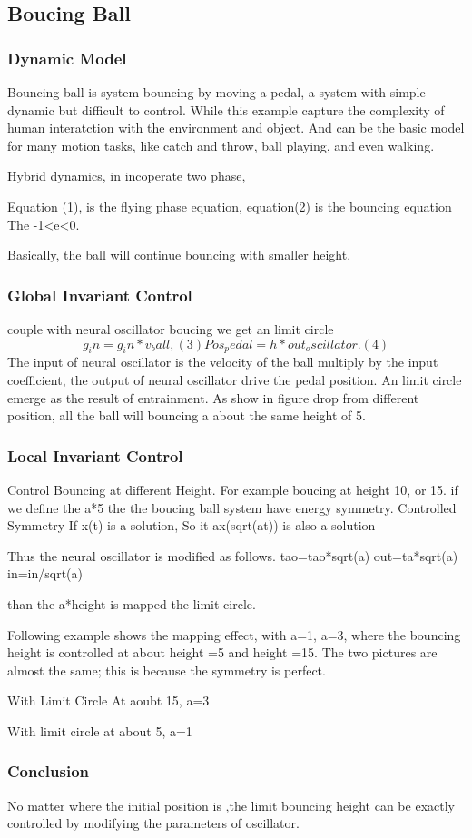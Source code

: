 \subsection{Boucing Ball}
\subsubsection*{Dynamic Model}
Bouncing ball is system bouncing by moving a pedal, a system with simple dynamic but difficult to control. 
While this example capture the complexity of human interatction with the environment and object. 
And can be the basic model for many motion tasks, like catch and throw, ball playing, and even walking.

Hybrid dynamics, in incoperate two phase, 
 



Equation (1), is the flying phase equation, equation(2) is the bouncing equation
The -1<e<0.

Basically, the ball will continue bouncing with smaller height.
\subsubsection*{Global Invariant Control}
couple with neural oscillator boucing we get an limit circle
\[g_in=g_in*v_ball, (3)
Pos_pedal=h*out_oscillator.  (4)
\]
The input of neural oscillator is the velocity of the ball multiply by the input coefficient, the output of neural oscillator  drive the pedal position.
An limit circle emerge as the result of entrainment.
As show in figure drop from different position, all the ball will bouncing a about the same height of 5.

\subsubsection*{Local Invariant Control}
Control Bouncing at different Height.
For example boucing at height 10, or 15.
if we define the a*5
the the boucing ball system have energy symmetry.
Controlled Symmetry
If  x(t) is a solution,
So it ax(sqrt(at)) is also a solution

Thus the neural oscillator is modified as follows.
tao=tao*sqrt(a)
out=ta*sqrt(a)
in=in/sqrt(a)

than the a*height is mapped the limit circle.

Following example shows the mapping effect, with a=1, a=3, where the bouncing height is controlled at about height =5 and height =15.
The two pictures are almost the same; this is because the symmetry is perfect.


With Limit Circle At aoubt 15, a=3

With limit circle at about 5, a=1

\subsubsection*{Conclusion}
No matter where the initial position is ,the limit bouncing height can be exactly controlled by modifying the parameters of oscillator.
